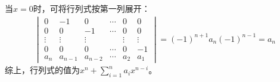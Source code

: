 \documentclass[10pt,xcolor=svgnames]{beamer} %
\begin{document}
\begin{frame}[allowframebreaks]
    当\(x=0\)时，可将行列式按第一列展开：
    \begin{align*}
        \begin{vmatrix}
            0      & -1      & 0       & \cdots & 0      & 0      \\
            0      & 0       & -1      & \cdots & 0      & 0      \\
            \vdots & \vdots  & \vdots  &        & \vdots & \vdots \\
            0      & 0       & 0       & \cdots & 0      & -1     \\
            a_n    & a_{n-1} & a_{n-2} & \cdots & a_2    & a_1
        \end{vmatrix}=(-1)^{n+1}a_n(-1)^{n-1}=a_n
    \end{align*}
    综上，行列式的值为\(x^n+\sum_{i=1}^{n}a_ix^{n-i}\)。
\end{frame}
\end{document}
